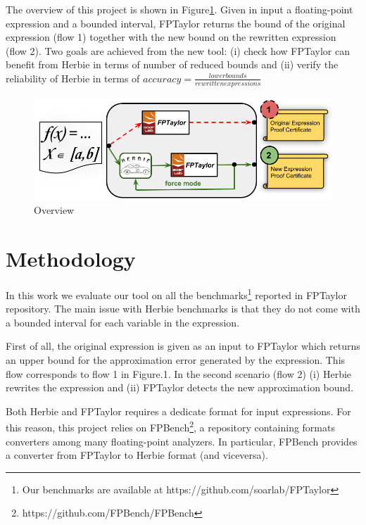 \documentclass[runningheads]{llncs}
\begin{document}
The overview of this project is shown in Figure\ref{fig:architecture}. Given in input a floating-point expression and a bounded interval, FPTaylor returns the bound of the original expression (flow 1) together with the new bound on the rewritten expression (flow 2). 
Two goals are achieved from the new tool: (i) check how FPTaylor can benefit from Herbie in terms of number of reduced bounds and (ii) verify the reliability of Herbie in terms of $accuracy= \frac{lower bounds}{rewritten expressions}$
\begin{figure}[t]
	\begin{center}
		\includegraphics[width=\columnwidth]{picture}
	\end{center}
	\caption{Overview}\label{fig:architecture}
\end{figure}

\section{Methodology}
In this work we evaluate our tool on all the benchmarks\footnote{Our benchmarks are available at https://github.com/soarlab/FPTaylor} reported in FPTaylor~\cite{fptaylor} repository. The main issue with Herbie benchmarks is that they do not come with a bounded interval for each variable in the expression.

First of all, the original expression is given as an input to FPTaylor which returns an upper bound for the approximation error generated by the expression. This flow corresponds to flow 1 in Figure.1.
In the second scenario (flow 2) (i) Herbie rewrites the expression and (ii) FPTaylor detects the new approximation bound.

Both Herbie and FPTaylor requires a dedicate format for input expressions. For this reason, this project relies on FPBench\footnote{https://github.com/FPBench/FPBench}, a repository containing formats converters among many floating-point analyzers. 
In particular, FPBench provides a converter from FPTaylor to Herbie format (and viceversa).
\end{document}
